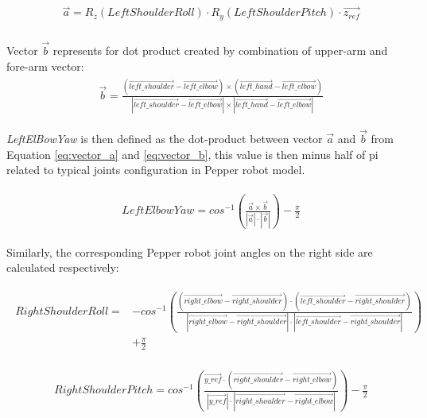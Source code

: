\begin{align} \label{eq:vector_a}
\begin{split}
& \vec{a} = R_z(LeftShoulderRoll) \cdot R_y(LeftShoulderPitch) \cdot \vec{z_{ref}} \\
\end{split}
\end{align}

Vector $\vec{b}$ represents for dot product created by combination of upper-arm and fore-arm vector:  
\begin{align} \label{eq:vector_b}
\begin{split}
& \vec{b} = \frac{(\vec{left\_shoulder} - \vec{left\_elbow}) \times (\vec{left\_hand} -\vec{left\_elbow})}{|\vec{left\_shoulder} - \vec{left\_elbow}| \times |\vec{left\_hand} -\vec{left\_elbow}|}
\end{split}
\end{align}

\textit{LeftElBowYaw} is then defined as the dot-product between vector $\vec{a}$ and $\vec{b}$ from Equation \ref{eq:vector_a} and \ref{eq:vector_b}, this value is then minus half of pi related to typical joints configuration in Pepper robot model.

\begin{align}
\begin{split}
& LeftElbowYaw = cos^{-1} \left(\frac{\vec{a} \times \vec{b}}{|\vec{a}| \cdot |\vec{b}|} \right) - \frac{\pi}{2}
\end{split}
\end{align}

Similarly, the corresponding Pepper robot joint angles on the right side are calculated respectively:

\begin{align}
\begin{split}
RightShoulderRoll =  & - cos^{-1} \left( \frac{(\vec{right\_elbow} - \vec{right\_shoulder}) \cdot (\vec{left\_shoulder} -\vec{right\_shoulder})}{|\vec{right\_elbow} - \vec{right\_shoulder}| \cdot |\vec{left\_shoulder} -\vec{right\_shoulder}|} \right) \\ & + \frac{\pi}{2}
\end{split}
\end{align}

\begin{align}
\begin{split}
& RightShoulderPitch = cos^{-1} \left( \frac{\vec{y\_ref} \cdot (\vec{right\_shoulder} -\vec{right\_elbow})}{|\vec{y\_ref}| \cdot |\vec{right\_shoulder} -\vec{right\_elbow}|} \right) - \frac{\pi}{2}
\end{split}
\end{align}

